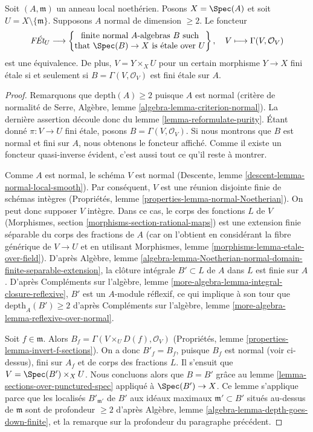 \begin{lemma}
\label{lemma-reformulate-purity-normal}
Soit $(A, \mathfrak m)$ un anneau local noethérien. Posons $X = \Spec(A)$
et soit $U = X \setminus \{\mathfrak m\}$. Supposons $A$ normal
de dimension $\geq 2$. Le foncteur
$$
\textit{F\'Et}_U \longrightarrow
\left\{
\begin{matrix}
\text{finite normal }A\text{-algebras }B\text{ such} \\
\text{that }\Spec(B) \to X\text{ is \'etale over }U
\end{matrix}
\right\},
\quad
V \longmapsto \Gamma(V, \mathcal{O}_V)
$$
est une équivalence. De plus, $V = Y \times_X U$ pour un certain morphisme $Y \to X$
fini étale si et seulement si $B = \Gamma(V, \mathcal{O}_V)$
est fini étale sur $A$.
\end{lemma}

\begin{proof}
Remarquons que $\text{depth}(A) \geq 2$ puisque $A$ est normal
(critère de normalité de Serre, Algèbre, lemme
\ref{algebra-lemma-criterion-normal}).
La dernière assertion découle donc du lemme \ref{lemma-reformulate-purity}.
Étant donné $\pi : V \to U$ fini étale, posons $B = \Gamma(V, \mathcal{O}_V)$.
Si nous montrons que $B$ est normal et fini sur $A$, nous
obtenons le foncteur affiché. Comme il existe un foncteur quasi-inverse
évident, c'est aussi tout ce qu'il reste à montrer.

\medskip\noindent
Comme $A$ est normal, le schéma $V$ est normal
(Descente, lemme \ref{descent-lemma-normal-local-smooth}).
Par conséquent, $V$ est une réunion disjointe finie de schémas intègres
(Propriétés, lemme \ref{properties-lemma-normal-Noetherian}).
On peut donc supposer $V$ intègre.
Dans ce cas, le corps des fonctions $L$ de $V$
(Morphismes, section \ref{morphisms-section-rational-maps})
est une extension finie séparable du corps des fractions de $A$
(car on l'obtient en considérant la fibre générique
de $V \to U$ et en utilisant Morphismes, lemme
\ref{morphisms-lemma-etale-over-field}).
D'après Algèbre, lemme
\ref{algebra-lemma-Noetherian-normal-domain-finite-separable-extension},
la clôture intégrale $B' \subset L$ de $A$ dans $L$ est finie sur $A$.
D'après Compléments sur l'algèbre, lemme \ref{more-algebra-lemma-integral-closure-reflexive},
$B'$ est un $A$-module réflexif, ce qui implique à son tour
que $\text{depth}_A(B') \geq 2$ d'après
Compléments sur l'algèbre, lemme \ref{more-algebra-lemma-reflexive-over-normal}.

\medskip\noindent
Soit $f \in \mathfrak m$. Alors $B_f = \Gamma(V \times_U D(f), \mathcal{O}_V)$
(Propriétés, lemme \ref{properties-lemma-invert-f-sections}).
On a donc $B'_f = B_f$, puisque $B_f$ est normal (voir ci-dessus),
fini sur $A_f$ et de corps des fractions $L$.
Il s'ensuit que $V = \Spec(B') \times_X U$.
Nous concluons alors que $B = B'$ grâce au
lemme \ref{lemma-sections-over-punctured-spec}
appliqué à $\Spec(B') \to X$.
Ce lemme s'applique parce que les localisés $B'_{\mathfrak m'}$
de $B'$ aux idéaux maximaux $\mathfrak m' \subset B'$ situés au-dessus de
$\mathfrak m$ sont de profondeur $\geq 2$ d'après
Algèbre, lemme \ref{algebra-lemma-depth-goes-down-finite},
et la remarque sur la profondeur du paragraphe précédent.
\end{proof}

